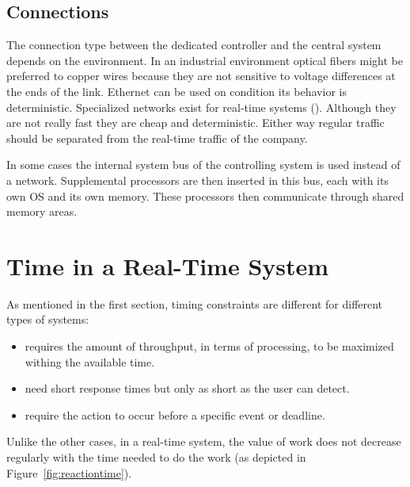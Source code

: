 \documentclass[../main.tex]{subfiles}
\begin{document}
\subsection{Connections}
The connection type between the dedicated controller and the central system depends on the environment.
In an industrial environment optical fibers might be preferred to copper wires because they are not sensitive to voltage differences at the ends of the link.
Ethernet can be used on condition its behavior is deterministic.
Specialized networks exist for real-time systems ().
Although they are not really fast they are cheap and deterministic. Either way regular traffic should be separated from the  real-time traffic of the company.

In some cases the internal system bus of the controlling system is used instead of a network. Supplemental processors are then inserted in this bus, each with its own OS and its own memory. These processors then communicate through shared memory areas.

\section{Time in a Real-Time System}
As mentioned in the first section, timing constraints are different for different types of systems:
\begin{itemize}
	\item {} requires the amount of throughput, in terms of processing, to be maximized withing the available time.
	\item {} need short response times but only as short as the user can detect.
	\item {} require the action to occur before a specific event or deadline.
\end{itemize}
Unlike the other cases, in a real-time system, the value of work does not decrease regularly with the time needed to do the work (as depicted in Figure~\ref{fig:reactiontime}).
\end{document}
